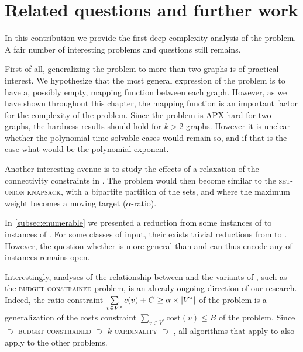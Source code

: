 	\section{Related questions and further work}

		In this contribution we provide the first deep complexity analysis of the \mwccs{} problem.
		A fair number of interesting problems and questions still remains.

		First of all, generalizing the problem to more than two graphs is of practical interest.
		We hypothesize that the most general expression of the problem is to have a, possibly empty, mapping function between each graph.
		However, as we have shown throughout this chapter, the mapping function is an important factor for the complexity of the problem.
		Since the \mwccs{} problem is APX-hard for two graphs, the hardness results should hold for $k > 2$ graphs.
		However it is unclear whether the polynomial-time solvable cases would remain so, and if that is the case what would be the polynomial exponent.

		Another interesting avenue is to study the effects of a relaxation of the connectivity constraints in \mwccs{}.
		The problem would then become similar to the \textsc{set-union knapsack}, with a bipartite partition of the sets, and where the maximum weight becomes a moving target ($\alpha$-ratio).

		In \cref{subsec:enumerable} we presented a reduction from some instances of \mwccs{} to instances of \rbmwcs{}.
		For some classes of input, their exists trivial reductions from \rbmwcs{} to \mwccs{}.
		However, the question whether \mwccs{} is more general than \rbmwcs{} and can thus encode any of \rbmwcs{} instances remains open.

		Interestingly, analyses of the relationship between \rbmwcs{} and the variants of \mwcs{}, such as the \textsc{budget constrained} problem, is an already ongoing direction of our research.
		Indeed, the ratio constraint $\sum\limits_{v \in V^*}{c(v)} + C \geq \alpha\times\lvert V^*\rvert$ of the \rbmwcs{} problem is a generalization of the costs constraint $\sum\limits_{v \in V^*}{\text{cost}(v)} \leq B$ of the \bcmwcs{} problem. %
		Since \rbmwcs{} $\supset$ \textsc{budget constrained \mwcs{}} $\supset$ \textsc{$k$-cardinality \mwcs{}} $\supset$ \mwcs{}, all algorithms that apply to \rbmwcs{} also apply to the other problems.

